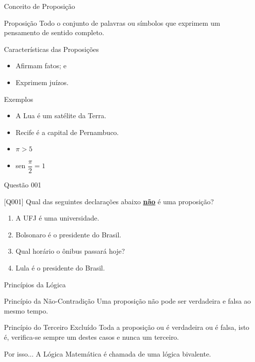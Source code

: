 \documentclass[xcolor=dvipsnames,table]{beamer}
\begin{document}
	\begin{frame}{Conceito de Proposição}
		\begin{block}{Proposição}
			Todo o conjunto de palavras ou símbolos que exprimem um pensamento de sentido completo.
		\end{block} \pause
		\begin{block}{Características das Proposições}
				\begin{itemize}[label=-] \pause
					\item Afirmam fatos; e  \pause
					\item Exprimem juízos.
				\end{itemize}
		\end{block} \pause
		\begin{block}{Exemplos}
			\begin{itemize}[label=-]
				\item A Lua é um satélite da Terra.
				\item Recife é a capital de Pernambuco.
				\item $\pi > 5$
				\item sen $\dfrac{\pi}{2} = 1$
			\end{itemize}
		\end{block}
\end{frame}

	\begin{frame}{Questão 001}
		\begin{block}{[Q001]}
			Qual das seguintes declarações abaixo \underline{\bf não} é uma proposição?
		\end{block}
		\begin{enumerate}[label=(\Alph*)]
			\item A UFJ é uma universidade.
			\item Bolsonaro é o presidente do Brasil.
			\item Qual horário o ônibus passará hoje?
			\item Lula é o presidente do Brasil.
		\end{enumerate}
	\end{frame}

	\begin{frame}{Princípios da Lógica}
		\begin{block}{Princípio da Não-Contradição}
			Uma proposição não pode ser verdadeira e falsa ao mesmo tempo.
		\end{block} \pause
		\begin{block}{Princípio do Terceiro Excluído}
			Toda a proposição ou é verdadeira ou é falsa, isto é, verifica-se sempre um destes casos e nunca um terceiro.
		\end{block} \pause
		\begin{exampleblock}{Por isso...}
			A Lógica Matemática é chamada de uma lógica bivalente.
		\end{exampleblock}
	\end{frame}
\end{document}
